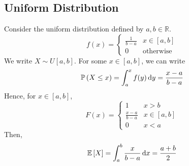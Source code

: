 \documentclass{article}
\begin{document}
\subsection{Uniform Distribution}
Consider the uniform distribution defined by $a, b \in\mathbb R$.
\[ f(x) = \begin{cases}
        \frac{1}{b-a} & x \in [a, b]     \\
        0             & \text{otherwise}
    \end{cases} \]
We write $X \sim U[a, b]$. For some $x \in [a,b]$, we can write
\[ \mathbb{P}\left({X \leq x}\right) = \int_a^x f(y) \dd{y} = \frac{x-a}{b-a} \]
Hence, for $x \in [a,b]$,
\[ F(x) = \begin{cases}
        1               & x > b       \\
        \frac{x-a}{b-a} & x \in [a,b] \\
        0               & x < a
    \end{cases} \]
Then,
\[ \mathbb{E}\left[{X}\right] = \int_a^b \frac{x}{b-a} \dd{x} = \frac{a+b}{2} \]
\end{document}
